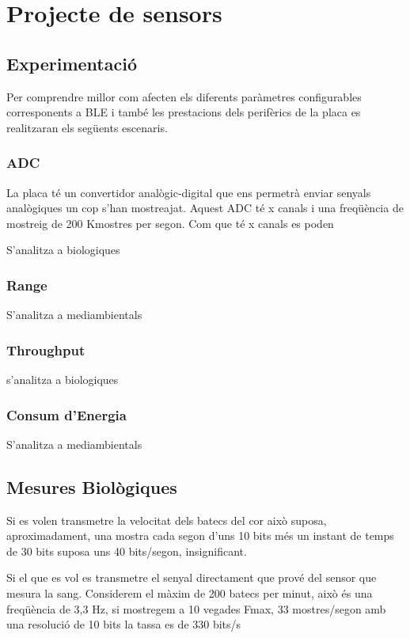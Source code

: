 \chapter{Projecte de sensors}
\section{Experimentació}
Per comprendre millor com afecten els diferents paràmetres configurables corresponents a BLE i també les prestacions dels perifèrics de la placa es realitzaran els següents escenaris.

\subsection{ADC}
La placa té un convertidor analògic-digital que ens permetrà enviar senyals analògiques un cop s'han mostreajat.
Aquest ADC té x canals i una freqüència de mostreig de 200 Kmostres per segon.
Com que té x canals es poden 

S'analitza a biologiques


\subsection{Range}

S'analitza a mediambientals

\subsection{Throughput}

s'analitza a biologiques

\subsection{Consum d'Energia}

S'analitza a mediambientals


\section{Mesures Biològiques}

Si es volen transmetre la velocitat dels batecs del cor això suposa, aproximadament, una mostra cada segon d'uns 10 bits més un instant de temps de 30 bits suposa uns 40 bits/segon, insignificant.

Si el que es vol es transmetre el senyal directament que prové del sensor que mesura la sang.
Considerem el màxim de 200 batecs per minut, això és una freqüència de 3,3 Hz, si mostregem a 10 vegades Fmax, 33 mostres/segon amb una resolució de 10 bits la tassa es de 330 bits/s

